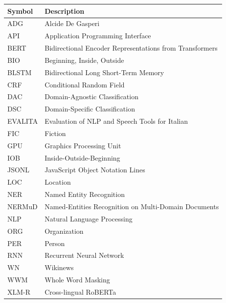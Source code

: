 \begin{table}[h!]
\centering
\begin{tabular}{p{3cm} p{11cm}}
\hline
\textbf{Symbol} & \textbf{Description} \\
\hline

ADG & Alcide De Gasperi \\
API & Application Programming Interface \\
BERT & Bidirectional Encoder Representations from Transformers \\
BIO & Beginning, Inside, Outside \\
BLSTM & Bidirectional Long Short-Term Memory \\
CRF & Conditional Random Field \\
DAC & Domain-Agnostic Classification \\
DSC & Domain-Specific Classification \\
EVALITA & Evaluation of NLP and Speech Tools for Italian \\
FIC & Fiction \\
GPU & Graphics Processing Unit \\
IOB & Inside-Outside-Beginning \\
JSONL & JavaScript Object Notation Lines \\
LOC & Location \\
NER & Named Entity Recognition \\
NERMuD & Named-Entities Recognition on Multi-Domain Documents \\
NLP & Natural Language Processing \\
ORG & Organization \\
PER & Person \\
RNN & Recurrent Neural Network \\
WN & Wikinews \\
WWM & Whole Word Masking \\
XLM-R & Cross-lingual RoBERTa \\

\hline
\end{tabular}
\end{table}